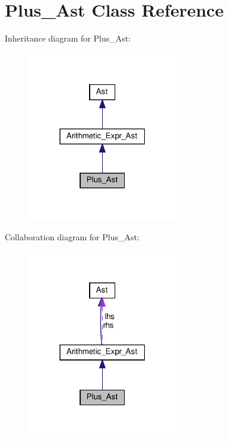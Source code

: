 \hypertarget{classPlus__Ast}{}\section{Plus\+\_\+\+Ast Class Reference}
\label{classPlus__Ast}


Inheritance diagram for Plus\+\_\+\+Ast\+:
\nopagebreak
\begin{figure}[H]
\begin{center}
\leavevmode
\includegraphics[width=187pt]{classPlus__Ast__inherit__graph}
\end{center}
\end{figure}


Collaboration diagram for Plus\+\_\+\+Ast\+:
\nopagebreak
\begin{figure}[H]
\begin{center}
\leavevmode
\includegraphics[width=187pt]{classPlus__Ast__coll__graph}
\end{center}
\end{figure}
